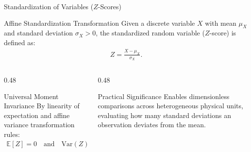 \documentclass[aspectratio=169,xcolor={dvipsnames,table}]{beamer}
\begin{document}
\begin{frame}{Standardization of Variables ($Z$-Scores)}
	\begin{block}{Affine Standardization Transformation}
		\small
		Given a discrete variable $X$ with mean $\mu_X$ and standard deviation $\sigma_X > 0$, the standardized random variable ($Z$-score) is defined as:
		\begin{align*}
			Z = \frac{X - \mu_X}{\sigma_X}.
		\end{align*}
	\end{block}
	\vspace{-0.15cm}
	\begin{columns}[T]
		\begin{column}{0.48\textwidth}
			\begin{exampleblock}{Universal Moment Invariance}
				\footnotesize
				By linearity of expectation and affine variance transformation rules:
				\begin{align*}
					\mathbb{E}[Z] = 0 \quad \text{and} \quad \text{Var}(Z) = 1.
				\end{align*}
			\end{exampleblock}
		\end{column}
		\begin{column}{0.48\textwidth}
			\begin{alertblock}{Practical Significance}
				\footnotesize
				Enables dimensionless comparisons across heterogeneous physical units, evaluating how many standard deviations an observation deviates from the mean.
			\end{alertblock}
		\end{column}
	\end{columns}
\end{frame}
\end{document}

